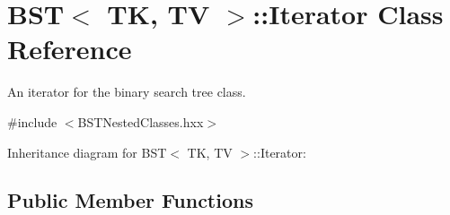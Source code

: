 \hypertarget{classBST_1_1Iterator}{}\section{B\+ST$<$ TK, TV $>$\+:\+:Iterator Class Reference}
\label{classBST_1_1Iterator}


An iterator for the binary search tree class.  




{\ttfamily \#include $<$B\+S\+T\+Nested\+Classes.\+hxx$>$}



Inheritance diagram for B\+ST$<$ TK, TV $>$\+:\+:Iterator\+:
\subsection*{Public Member Functions}
